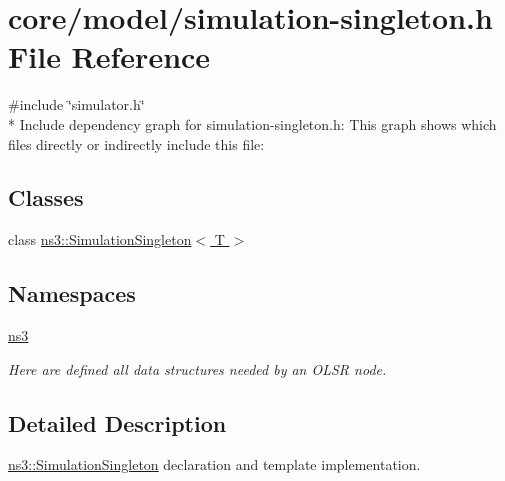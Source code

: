 \hypertarget{simulation-singleton_8h}{}\section{core/model/simulation-\/singleton.h File Reference}
\label{simulation-singleton_8h}
{\ttfamily \#include \char`\"{}simulator.\+h\char`\"{}}\\*
Include dependency graph for simulation-\/singleton.h\+:
This graph shows which files directly or indirectly include this file\+:
\subsection*{Classes}
\begin{DoxyCompactItemize}
\item 
class \hyperlink{classns3_1_1SimulationSingleton}{ns3\+::\+Simulation\+Singleton$<$ T $>$}
\end{DoxyCompactItemize}
\subsection*{Namespaces}
\begin{DoxyCompactItemize}
\item 
 \hyperlink{namespacens3}{ns3}
\begin{DoxyCompactList}\small\item\em Here are defined all data structures needed by an O\+L\+SR node. \end{DoxyCompactList}\end{DoxyCompactItemize}


\subsection{Detailed Description}
\hyperlink{classns3_1_1SimulationSingleton}{ns3\+::\+Simulation\+Singleton} declaration and template implementation. 